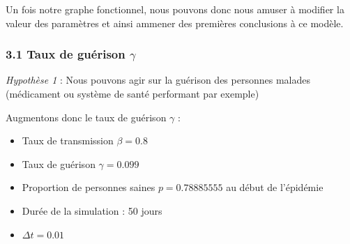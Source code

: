 \documentclass[
]{article}
\providecommand{\tightlist}{%
  \setlength{\itemsep}{0pt}\setlength{\parskip}{0pt}}
\begin{document}
Un fois notre graphe fonctionnel, nous pouvons donc nous amuser à
modifier la valeur des paramètres et ainsi ammener des premières
conclusions à ce modèle.

\hypertarget{taux-de-guuxe9rison-gamma}{%
\subsubsection{\texorpdfstring{3.1 Taux de guérison
\(\gamma\)}{3.1 Taux de guérison \textbackslash gamma}}\label{taux-de-guuxe9rison-gamma}}

\emph{Hypothèse 1} : Nous pouvons agir sur la guérison des personnes
malades (médicament ou système de santé performant par exemple)

Augmentons donc le taux de guérison \(\gamma\) :

\begin{itemize}
\tightlist
\item
  Taux de transmission \(\beta = 0.8\)
\item
  Taux de guérison \(\gamma=0.099\)
\item
  Proportion de personnes saines \(p=0.78885555\) au début de l'épidémie
\item
  Durée de la simulation : 50 jours
\item
  \(\Delta t= 0.01\)
\end{itemize}
\end{document}
